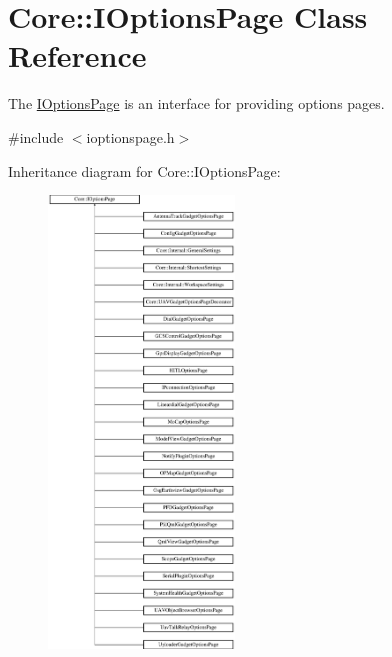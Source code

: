 \hypertarget{class_core_1_1_i_options_page}{\section{\-Core\-:\-:\-I\-Options\-Page \-Class \-Reference}
\label{class_core_1_1_i_options_page}
}


\-The \hyperlink{class_core_1_1_i_options_page}{\-I\-Options\-Page} is an interface for providing options pages.  




{\ttfamily \#include $<$ioptionspage.\-h$>$}

\-Inheritance diagram for \-Core\-:\-:\-I\-Options\-Page\-:\begin{figure}[H]
\begin{center}
\leavevmode
\includegraphics[height=12.000000cm]{class_core_1_1_i_options_page}
\end{center}
\end{figure}
